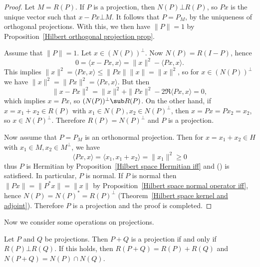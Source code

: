 \begin{proof}
Let $M=R(P)$. If $P$ is a projection, then $N(P)\bot R(P)$, so $Px$ is the unique vector such that $x-Px\bot M$. It follows that $P=P_M$, by the uniqueness of orthogonal projections. With this, we then have $\|P\|=1$ by Proposition~\ref{Hilbert orthogonal projection prop}.\par
Assume that $\|P\|=1$. Let $x\in(N(P))^\bot$. Now $N(P)=R(I-P)$, hence
\[0=\langle x-Px,x\rangle=\|x\|^2-\langle Px,x\rangle.\]
This implies $\|x\|^2=\langle Px,x\rangle\leq\|Px\|\|x\|=\|x\|^2$, so for $x\in(N(P))^\bot$ we have $\|x\|^2=\|Px\|^2=\langle Px,x\rangle$. But then
\[\|x-Px\|^2=\|x\|^2+\|Px\|^2-2\Re\langle Px,x\rangle=0,\]
which implies $x=Px$, so $(N(P))^\bot\sub R(P)$. On the other hand, if $x=x_1+x_2\in R(P)$ with $x_1\in N(P),x_2\in N(P)^\bot$, then $x=Px=Px_2=x_2$, so $x\in N(P)^\bot$. Therefore $R(P)=N(P)^\bot$ and $P$ is a projection.\par
Now assume that $P=P_M$ is an orthonormal projection. Then for $x=x_1+x_2\in H$ with $x_1\in M,x_2\in M^\bot$, we have
\[\langle Px,x\rangle=\langle x_1,x_1+x_2\rangle=\|x_1\|^2\geq 0\]
thus $P$ is Hermitian by Proposition~\ref{Hilbert space Hermitian iff} and () is satisfieed. In particular, $P$ is normal. If $P$ is normal then $\|Px\|=\|P^*x\|=\|x\|$ by Proposition~\ref{Hilbert space normal operator iff}, hence $N(P)=N(P)^*=R(P)^\bot$ (Theorem~\ref{Hilbert space kernel and adjoint}). Therefore $P$ is a projection and the proof is completed.
\end{proof}
Now we consider some operations on projections.
\begin{proposition}\label{Hilbert space sum of projection}
Let $P$ and $Q$ be projections. Then $P+Q$ is a projection if and only if $R(P)\bot R(Q)$. If this holds, then $R(P+Q)=R(P)+R(Q)$ and $N(P+Q)=N(P)\cap N(Q)$.
\end{proposition}

